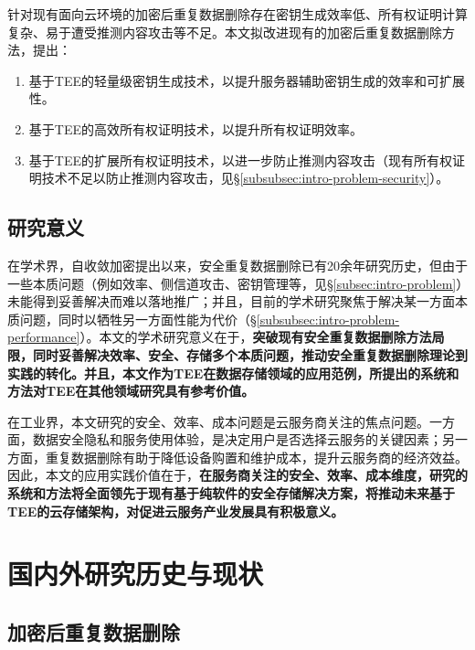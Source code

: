 针对现有面向云环境的加密后重复数据删除存在密钥生成效率低、所有权证明计算复杂、易于遭受推测内容攻击等不足。本文拟改进现有的加密后重复数据删除方法，提出：

\begin{enumerate}
    \item 基于TEE的轻量级密钥生成技术，以提升服务器辅助密钥生成的效率和可扩展性。
    \item 基于TEE的高效所有权证明技术，以提升所有权证明效率。
    \item 基于TEE的扩展所有权证明技术，以进一步防止推测内容攻击（现有所有权证明技术不足以防止推测内容攻击，见\S\ref{subsubsec:intro-problem-security}）。
\end{enumerate}

\subsection{研究意义}
\label{subsec:intro-meaning}

在学术界，自收敛加密\cite{douceur2002reclaiming}提出以来，安全重复数据删除已有20余年研究历史，但由于一些本质问题（例如效率、侧信道攻击、密钥管理等，见\S\ref{subsec:intro-problem}）未能得到妥善解决而难以落地推广；并且，目前的学术研究聚焦于解决某一方面本质问题，同时以牺牲另一方面性能为代价（\S\ref{subsubsec:intro-problem-performance}）。本文的学术研究意义在于，\textbf{突破现有安全重复数据删除方法局限，同时妥善解决效率、安全、存储多个本质问题，推动安全重复数据删除理论到实践的转化。并且，本文作为TEE在数据存储领域的应用范例，所提出的系统和方法对TEE在其他领域研究具有参考价值。}

在工业界，本文研究的安全、效率、成本问题是云服务商关注的焦点问题。一方面，数据安全隐私和服务使用体验，是决定用户是否选择云服务的关键因素；另一方面，重复数据删除有助于降低设备购置和维护成本，提升云服务商的经济效益。因此，本文的应用实践价值在于，\textbf{在服务商关注的安全、效率、成本维度，研究的系统和方法将全面领先于现有基于纯软件的安全存储解决方案，将推动未来基于TEE的云存储架构，对促进云服务产业发展具有积极意义。}

\section{国内外研究历史与现状}
\label{sec:compare}

\subsection{加密后重复数据删除}
\label{subsec:compare-deduplication}

